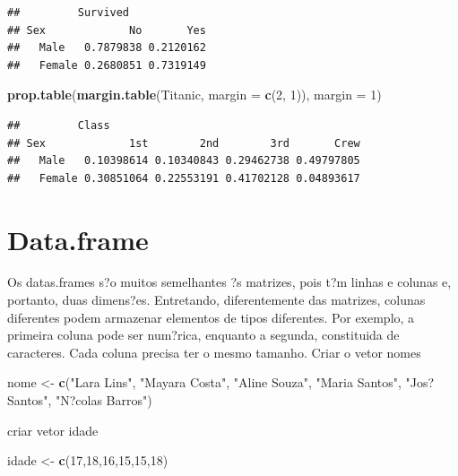 \documentclass[]{book}
\newenvironment{Shaded}{\begin{snugshade}}{\end{snugshade}}
\newcommand{\DataTypeTok}[1]{\textcolor[rgb]{0.13,0.29,0.53}{#1}}
\newcommand{\DecValTok}[1]{\textcolor[rgb]{0.00,0.00,0.81}{#1}}
\newcommand{\KeywordTok}[1]{\textcolor[rgb]{0.13,0.29,0.53}{\textbf{#1}}}
\newcommand{\NormalTok}[1]{#1}
\newcommand{\StringTok}[1]{\textcolor[rgb]{0.31,0.60,0.02}{#1}}
\begin{document}
\begin{verbatim}
##         Survived
## Sex             No       Yes
##   Male   0.7879838 0.2120162
##   Female 0.2680851 0.7319149
\end{verbatim}

\begin{Shaded}
\begin{Highlighting}[]
\KeywordTok{prop.table}\NormalTok{(}\KeywordTok{margin.table}\NormalTok{(Titanic, }\DataTypeTok{margin =} \KeywordTok{c}\NormalTok{(}\DecValTok{2}\NormalTok{, }\DecValTok{1}\NormalTok{)), }\DataTypeTok{margin =} \DecValTok{1}\NormalTok{)}
\end{Highlighting}
\end{Shaded}

\begin{verbatim}
##         Class
## Sex             1st        2nd        3rd       Crew
##   Male   0.10398614 0.10340843 0.29462738 0.49797805
##   Female 0.30851064 0.22553191 0.41702128 0.04893617
\end{verbatim}

\hypertarget{data.frame}{%
\section{Data.frame}\label{data.frame}}

Os datas.frames s?o muitos semelhantes ?s matrizes, pois t?m linhas e colunas e, portanto, duas dimens?es. Entretando, diferentemente das matrizes, colunas diferentes podem armazenar elementos de tipos diferentes. Por exemplo, a primeira coluna pode ser num?rica, enquanto a segunda, constituida de caracteres. Cada coluna precisa ter o mesmo tamanho.
Criar o vetor nomes

\begin{Shaded}
\begin{Highlighting}[]
\NormalTok{nome <-}\StringTok{ }\KeywordTok{c}\NormalTok{(}\StringTok{"Lara Lins"}\NormalTok{,}
          \StringTok{"Mayara Costa"}\NormalTok{,}
          \StringTok{"Aline Souza"}\NormalTok{,}
          \StringTok{"Maria Santos"}\NormalTok{,}
          \StringTok{"Jos? Santos"}\NormalTok{,}
          \StringTok{"N?colas Barros"}\NormalTok{)}
\end{Highlighting}
\end{Shaded}

criar vetor idade

\begin{Shaded}
\begin{Highlighting}[]
\NormalTok{idade <-}\StringTok{ }\KeywordTok{c}\NormalTok{(}\DecValTok{17}\NormalTok{,}\DecValTok{18}\NormalTok{,}\DecValTok{16}\NormalTok{,}\DecValTok{15}\NormalTok{,}\DecValTok{15}\NormalTok{,}\DecValTok{18}\NormalTok{)}
\end{Highlighting}
\end{Shaded}
\end{document}
